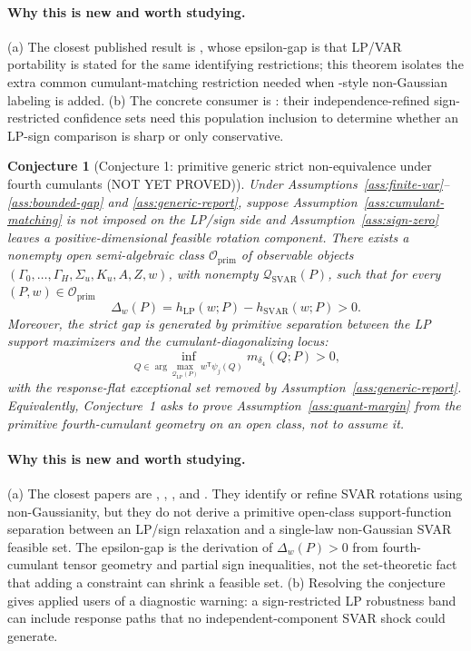 \documentclass[11pt]{article}
\newcommand{\transpose}{\mathsf{T}}
\theoremstyle{definition}
\theoremstyle{plain}
\newtheorem{conjecture}{Conjecture}
\theoremstyle{remark}
\begin{document}
\paragraph{Why this is new and worth studying.}
(a) The closest published result is \citet{PlagborgMollerWolf2021}, whose epsilon-gap is that LP/VAR portability is stated for the same identifying restrictions; this theorem isolates the extra common cumulant-matching restriction needed when \citet{LanneMeitzSaikkonen2017}-style non-Gaussian labeling is added.  (b) The concrete consumer is \citet{DrautzburgWright2023}: their independence-refined sign-restricted confidence sets need this population inclusion to determine whether an LP-sign comparison is sharp or only conservative.

\begin{conjecture}[Conjecture 1: primitive generic strict non-equivalence under fourth cumulants (NOT YET PROVED)]\label{conj:primitive-strict-gap}
Under Assumptions~\ref{ass:finite-var}--\ref{ass:bounded-gap} and \ref{ass:generic-report}, suppose Assumption~\ref{ass:cumulant-matching} is not imposed on the LP/sign side and Assumption~\ref{ass:sign-zero} leaves a positive-dimensional feasible rotation component.  There exists a nonempty open semi-algebraic class \(\mathcal O_{\mathrm{prim}}\) of observable objects \((\Gamma_0,\ldots,\Gamma_H,\Sigma_u,K_u,A,Z,w)\), with nonempty \(\mathcal Q_{\mathrm{SVAR}}(P)\), such that for every \((P,w)\in\mathcal O_{\mathrm{prim}}\)
\[
\Delta_w(P)=h_{\mathrm{LP}}(w;P)-h_{\mathrm{SVAR}}(w;P)>0.
\]
Moreover, the strict gap is generated by primitive separation between the LP support maximizers and the cumulant-diagonalizing locus:
\[
\inf_{Q\in\arg\max_{\mathcal Q_{\mathrm{LP}}(P)} w^\transpose\psi_j(Q)}
m_{\delta_4}(Q;P)>0,
\]
with the response-flat exceptional set removed by Assumption~\ref{ass:generic-report}.  Equivalently, Conjecture~1 asks to prove Assumption~\ref{ass:quant-margin} from the primitive fourth-cumulant geometry on an open class, not to assume it.
\end{conjecture}
\paragraph{Why this is new and worth studying.}
(a) The closest papers are \citet{LanneMeitzSaikkonen2017}, \citet{GourierouxMonfortRenne2017}, \citet{Guay2021}, and \citet{DrautzburgWright2023}.  They identify or refine SVAR rotations using non-Gaussianity, but they do not derive a primitive open-class support-function separation between an LP/sign relaxation and a single-law non-Gaussian SVAR feasible set.  The epsilon-gap is the derivation of \(\Delta_w(P)>0\) from fourth-cumulant tensor geometry and partial sign inequalities, not the set-theoretic fact that adding a constraint can shrink a feasible set.  (b) Resolving the conjecture gives applied users of \citet{DrautzburgWright2023} a diagnostic warning: a sign-restricted LP robustness band can include response paths that no independent-component SVAR shock could generate.
\end{document}
